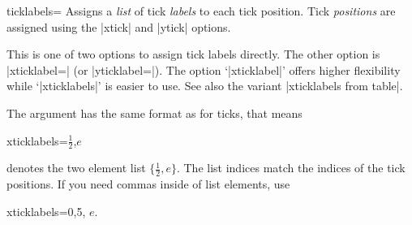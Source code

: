 \begin{pgfplotsxykey}{\x ticklabels=}
\label{pgfplots:key:xticklabels}%
%
    Assigns a \emph{list} of tick \emph{labels} to each tick position. Tick
    \emph{positions} are assigned using the |xtick| and |ytick| options.

    This is one of two options to assign tick labels directly. The other option
    is |xticklabel=| (or |yticklabel=|). The option
    `|xticklabel|' offers higher flexibility while `|xticklabels|' is easier to
    use. See also the variant |xticklabels from table|.

    The argument  has the same format as for ticks, that means
\begin{codeexample}
xticklabels={$\frac{1}{2}$,$e$}
\end{codeexample}
    denotes the two element list $\{\frac 12, e\}$. The list indices match the
    indices of the tick positions. If you need commas inside of list elements,
    use
\begin{codeexample}
xticklabels={{0,5}, $e$}.
\end{codeexample}

\begin{codeexample}[]
\end{codeexample}

\begin{codeexample}[]
\end{codeexample}


\end{pgfplotsxykey}
